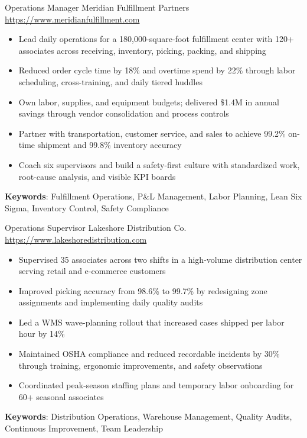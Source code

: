 \documentclass[a4paper, serif, 10pt]{moderncv}
\begin{document}
        {Operations Manager}
        {Meridian Fulfillment Partners}
        {\url{https://www.meridianfulfillment.com}}
        {}
        {\begin{itemize}
\item Lead daily operations for a 180,000-square-foot fulfillment center with 120+ associates across receiving, inventory, picking, packing, and shipping
\item Reduced order cycle time by 18\% and overtime spend by 22\% through labor scheduling, cross-training, and daily tiered huddles
\item Own labor, supplies, and equipment budgets; delivered \$1.4M in annual savings through vendor consolidation and process controls
\item Partner with transportation, customer service, and sales to achieve 99.2\% on-time shipment and 99.8\% inventory accuracy
\item Coach six supervisors and build a safety-first culture with standardized work, root-cause analysis, and visible KPI boards
\end{itemize}
\textbf{Keywords}: Fulfillment Operations, P\&L Management, Labor Planning, Lean Six Sigma, Inventory Control, Safety Compliance}

        {Operations Supervisor}
        {Lakeshore Distribution Co.}
        {\url{https://www.lakeshoredistribution.com}}
        {}
        {\begin{itemize}
\item Supervised 35 associates across two shifts in a high-volume distribution center serving retail and e-commerce customers
\item Improved picking accuracy from 98.6\% to 99.7\% by redesigning zone assignments and implementing daily quality audits
\item Led a WMS wave-planning rollout that increased cases shipped per labor hour by 14\%
\item Maintained OSHA compliance and reduced recordable incidents by 30\% through training, ergonomic improvements, and safety observations
\item Coordinated peak-season staffing plans and temporary labor onboarding for 60+ seasonal associates
\end{itemize}
\textbf{Keywords}: Distribution Operations, Warehouse Management, Quality Audits, Continuous Improvement, Team Leadership}
\end{document}
